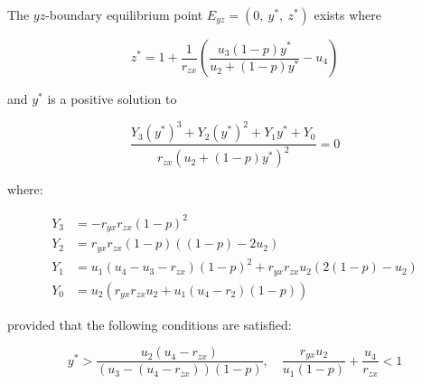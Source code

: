 \begin{theorem}\label{thm:eq-boundary-yz-exist}
    The $yz$-boundary equilibrium point $E_{yz}=\left(0,\ y^*,\ z^*\right)$ exists where
    
    \begin{equation*}
        z^*=1+\frac{1}{r_{zx}}\left(\frac{u_3\left(1-p\right)y^*}{u_2+\left(1-p\right)y^*}-u_4\right)
    \end{equation*}

    and $y^*$ is a positive solution to 

    \begin{equation*}
        \frac{Y_3\left(y^*\right)^3+Y_2\left(y^*\right)^2+Y_1y^*+Y_0}{r_{zx}\left(u_2+\left(1-p\right)y^*\right)^2}=0
    \end{equation*}

    where:

    \begin{align*}
        Y_3 &= -r_{yx}r_{zx}\left(1-p\right)^2\\
        Y_2 &= r_{yx}r_{zx}\left(1-p\right)\left(\left(1-p\right)-2u_2\right)\\
        Y_1 &= u_1\left(u_4-u_3-r_{zx}\right)\left(1-p\right)^2+r_{yx}r_{zx}u_2\left(2\left(1-p\right)-u_2\right)\\
        Y_0 &= u_2\left(r_{yx}r_{zx}u_2+u_1\left(u_4-r_2\right)\left(1-p\right)\right)
    \end{align*}

    provided that the following conditions are satisfied:
    
    \begin{equation*}
        y^*>\frac{u_2\left(u_4-r_{zx}\right)}{\left(u_3-\left(u_4-r_{zx}\right)\right)\left(1-p\right)},\quad \frac{r_{yx}u_2}{u_1\left(1-p\right)}+\frac{u_4}{r_{zx}}<1
    \end{equation*}
\end{theorem}
